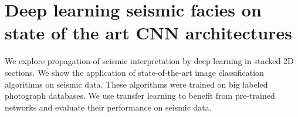 \chapter{Deep learning seismic facies on state of the art CNN architectures}

We explore propagation of seismic interpretation by deep learning in stacked 2D sections. We show the application of state-of-the-art image classification algorithms on seismic data. These algorithms were trained on big labeled photograph databases. We use transfer learning to benefit from pre-trained networks and evaluate their performance on seismic data.

{\vfill\hfill\newline{}}


